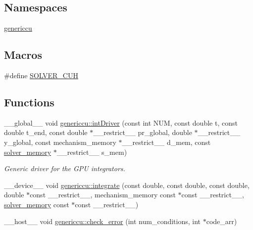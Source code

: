 \subsection*{Namespaces}
\begin{DoxyCompactItemize}
\item 
 \hyperlink{namespacegenericcu}{genericcu}
\end{DoxyCompactItemize}
\subsection*{Macros}
\begin{DoxyCompactItemize}
\item 
\#define \hyperlink{solver_8cuh_aeb5114b5c03776476cc8e7689face990}{S\+O\+L\+V\+E\+R\+\_\+\+C\+UH}
\end{DoxyCompactItemize}
\subsection*{Functions}
\begin{DoxyCompactItemize}
\item 
\+\_\+\+\_\+global\+\_\+\+\_\+ void \hyperlink{namespacegenericcu_aff46876594be0dced04cee0173535519}{genericcu\+::int\+Driver} (const int N\+UM, const double t, const double t\+\_\+end, const double $\ast$\+\_\+\+\_\+restrict\+\_\+\+\_\+ pr\+\_\+global, double $\ast$\+\_\+\+\_\+restrict\+\_\+\+\_\+ y\+\_\+global, const mechanism\+\_\+memory $\ast$\+\_\+\+\_\+restrict\+\_\+\+\_\+ d\+\_\+mem, const \hyperlink{structsolver__memory}{solver\+\_\+memory} $\ast$\+\_\+\+\_\+restrict\+\_\+\+\_\+ s\+\_\+mem)
\begin{DoxyCompactList}\small\item\em Generic driver for the G\+PU integrators. \end{DoxyCompactList}\item 
\+\_\+\+\_\+device\+\_\+\+\_\+ void \hyperlink{namespacegenericcu_ac62c1a51172ab7750c2f75688ca8e486}{genericcu\+::integrate} (const double, const double, const double, double $\ast$const \+\_\+\+\_\+restrict\+\_\+\+\_\+, mechanism\+\_\+memory const $\ast$const \+\_\+\+\_\+restrict\+\_\+\+\_\+, \hyperlink{structsolver__memory}{solver\+\_\+memory} const $\ast$const \+\_\+\+\_\+restrict\+\_\+\+\_\+)
\item 
\+\_\+\+\_\+host\+\_\+\+\_\+ void \hyperlink{namespacegenericcu_af403dabfc12de79ff9ab8575983d6f83}{genericcu\+::check\+\_\+error} (int num\+\_\+conditions, int $\ast$code\+\_\+arr)
\end{DoxyCompactItemize}


